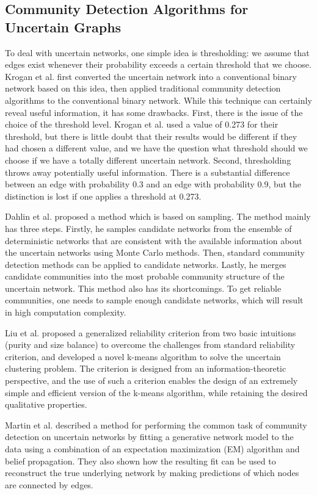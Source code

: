 \documentclass[\main/thesis.tex]{subfiles}
\begin{document}
\subsection{Community Detection Algorithms for Uncertain Graphs}
To deal with uncertain networks, one simple idea is thresholding: we assume that edges exist whenever their probability exceeds a certain threshold that we choose. Krogan et al. \cite{krogan2006global} first converted the uncertain network into a conventional binary network based on this idea, then applied traditional community detection algorithms to the conventional binary network. While this technique can certainly reveal useful information, it has some drawbacks. First, there is the issue of the choice of the threshold level. Krogan et al. used a value of 0.273 for their threshold, but there is little doubt that their results would be different if they had chosen a different value, and we have the question what threshold should we choose if we have a totally different uncertain network. Second, thresholding throws away potentially useful information. There is a substantial difference between an edge with probability 0.3 and an edge with probability 0.9, but the distinction is lost if one applies a threshold at 0.273.

Dahlin et al. \cite{dahlin2011method} proposed a method which is based on sampling. The method mainly has three steps. Firstly, he samples candidate networks from the ensemble of deterministic networks that are consistent with the available information about the uncertain networks using Monte Carlo methods. Then, standard community detection methods can be applied to candidate networks. Lastly, he merges candidate communities into the most probable community structure of the uncertain network. This method also has its shortcomings. To get reliable communities, one needs to sample enough candidate networks, which will result in high computation complexity.

Liu et al. \cite{liureliable} proposed a generalized reliability criterion from two basic intuitions (purity and size balance) to overcome the challenges from standard reliability criterion, and developed a novel k-means algorithm to solve the uncertain clustering problem. The criterion is designed from an information-theoretic perspective, and the use of such a criterion enables the design of an extremely simple and efficient version of the k-means algorithm, while retaining the desired qualitative properties.

Martin et al. \cite{martin2016structural} described a method for performing the common task of community detection on uncertain networks by fitting a generative network model to the data using a combination of an expectation maximization (EM) algorithm and belief propagation. They also shown how the resulting fit can be used to reconstruct the true underlying network by making predictions of which nodes are connected by edges. 
\end{document}
